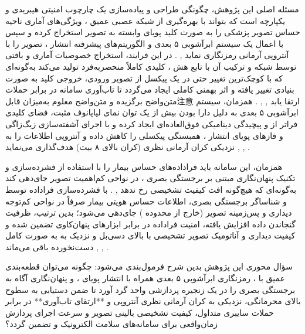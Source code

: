 مسئله اصلی این پژوهش، چگونگی طراحی و پیاده‌سازی یک چارچوب امنیتی هیبریدی و یکپارچه است که بتواند با بهره‌گیری از شبکه عصبی عمیق ، ویژگی‌های آماری ناحیه حساس تصویر پزشکی  را به صورت کلید پویای وابسته به تصویر استخراج کرده و سپس با اعمال یک سیستم ابرآشوبی ۵ بعدی و الگوریتم‌های پیشرفته انتشار ، تصویر را با آنتروپی آرمانی رمزنگاری نماید , . در این فرایند، استخراج خصوصیات آماری و بافتی  توسط شبکه  و ترکیب آن با تابع هش ، کلیدی کاملاً منحصر‌به‌فرد تولید می‌کند به‌گونه‌ای که با کوچک‌ترین تغییر حتی در یک پیکسل از تصویر ورودی، خروجی کلید به صورت بنیادی تغییر یافته و اثر بهمنی کاملی ایجاد می‌گردد تا تاب‌آوری سامانه در برابر حملات متن‌واضح برگزیده  و متن‌واضح معلوم  به‌میزان قابل‌注意 ارتقا یابد , , . همزمان، سیستم ابرآشوبی ۵ بعدی به دلیل دارا بودن بیش از یک توان نمای لیاپانوف مثبت، فضای کلیدی فراتر از  و پیچیدگی دینامیکی فوق‌العاده‌ای ایجاد کرده و با اجرای آشفته‌سازی زیگ‌زاگی  و فازهای پویای انتشار ، همبستگی پیکسلی را کاهش داده و آنتروپی اطلاعات را به نزدیکی کران آرمانی نظری (کران بالای ۸ بیت) هدف‌گذاری می‌نماید , , .\par



همزمان، این سامانه باید فراداده‌های حساس بیمار را با استفاده از فشرده‌سازی  و تکنیک پنهان‌نگاری مبتنی بر برجستگی بصری ، در نواحی کم‌اهمیت تصویر جای‌دهی کند به‌گونه‌ای که هیچ‌گونه افت کیفیت تشخیصی  رخ ندهد , . با فشرده‌سازی فراداده توسط  و شناساگر برجستگی بصری، اطلاعات حساس هویتی بیمار صرفاً در نواحی کم‌توجه دیداری و پس‌زمینه تصویر (خارج از محدوده ) جای‌دهی می‌شود؛ بدین ترتیب، ظرفیت گنجاندن داده افزایش یافته، امنیت فراداده در برابر ابزارهای پنهان‌کاوی تضمین شده و کیفیت دیداری و آناتومیک تصویر تشخیصی با  بالای  دسی‌بل و  نزدیک به  به صورت کامل دست‌نخورده باقی می‌ماند , , .\par



سؤال محوری این پژوهش بدین شرح فرمول‌بندی می‌شود: چگونه می‌توان قطعه‌بندی عمیق با ، رمزنگاری ابرآشوبی ۵ بعدی همراه با انتشار پویای ، و پنهان‌نگاری آگاه به برجستگی بصری را در یک زنجیره پردازشی واحد گرد آورد تا ضمن دستیابی به سطوح بالای محرمانگی، نزدیکی به کران آرمانی نظری آنتروپی و **ارتقای تاب‌آوری** در برابر حملات سایبری متداول، کیفیت تشخیصی بالینی تصویر و سرعت اجرای پردازش زمان‌واقعی برای سامانه‌های سلامت الکترونیک و  تضمین گردد؟\par

